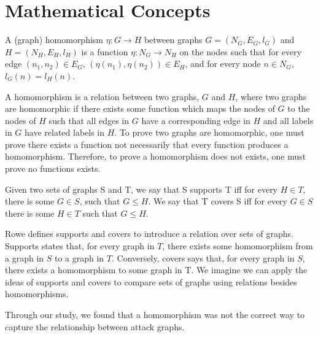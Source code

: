 \section{Mathematical Concepts }

\begin{definition}[Homomorphism]
    A (graph) homomorphism $\eta : G \to H$ between graphs $G = (N_G, E_G, l_G)$ and $H = (N_H, E_H, l_H)$ is a function $\eta : N_G \to N_H$ on the nodes such that for every edge $(n_1, n_2) \in E_G$, $(\eta(n_1), \eta(n_2)) \in E_H$, and for every node $n \in N_G$, $l_G(n) = l_H(n)$.  \cite{Rowe:2021:OnOrdering}
\end{definition}

A homomorphism is a relation between two graphs, $G$ and $H$, where two graphs are homomorphic if there exists some function which maps the nodes of $G$ to the nodes of $H$ such that all edges in $G$ have a corresponding edge in $H$ and all labels in $G$ have related labels in $H$. To prove two graphs are homomorphic, one must prove there exists a function not necessarily that every function produces a homomorphism. Therefore, to prove a homomorphism does not exists, one must prove no functions exists. 

\begin{definition}
    Given two sets of graphs S and T, we say that S supports T iff for every $H \in T$, there is some $G \in S$, such that $G \leq H$. We  say that T covers S iff for every $G \in S$ there is some $H \in T$ such that $G \leq H. $\cite{Rowe:2021:OnOrdering}
\end{definition}

Rowe defines supports and covers to introduce a relation over sets of graphs. Supports states that, for every graph in $T$, there exists some homomorphism from a graph in $S$ to a graph in $T$. Conversely, covers says that, for every graph in $S$, there exists a homomorphism to some graph in T. We imagine we can apply the ideas of supports and covers to compare sets of graphs using relations besides homomorphisms. 

Through our study, we found that a homomorphism was not the correct way to capture the relationship between attack graphs. 

